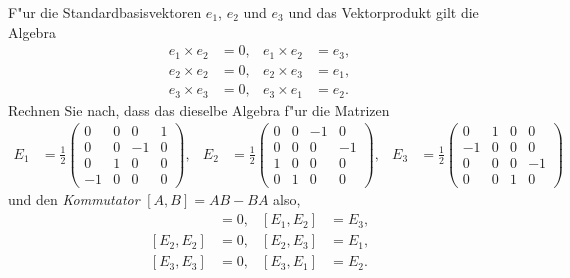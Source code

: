 F"ur die Standardbasisvektoren $e_1$, $e_2$ und $e_3$ und das Vektorprodukt
gilt die Algebra
\begin{align*}
e_1\times e_2&=0,&
e_1\times e_2&=e_3,\\
e_2\times e_2&=0,&
e_2\times e_3&=e_1,\\
e_3\times e_3&=0,&
e_3\times e_1&=e_2.
\end{align*}
Rechnen Sie nach, dass das dieselbe Algebra f"ur die Matrizen
\begin{align*}
E_1&=\frac12\begin{pmatrix}
 0& 0& 0& 1\\
 0& 0&-1& 0\\
 0& 1& 0& 0\\
-1& 0& 0& 0
\end{pmatrix},
&
E_2&=\frac12\begin{pmatrix}
 0& 0&-1& 0\\
 0& 0& 0&-1\\
 1& 0& 0& 0\\
 0& 1& 0& 0
\end{pmatrix},
&
E_3&=\frac12\begin{pmatrix}
 0& 1& 0& 0\\
-1& 0& 0& 0\\
 0& 0& 0&-1\\
 0& 0& 1& 0
\end{pmatrix}
&
\end{align*}
und den {\em Kommutator} $[A,B]=AB-BA$ also,
\begin{align*}
[E_1, E_2]&=0,&
[E_1, E_2]&=E_3,\\
[E_2, E_2]&=0,&
[E_2, E_3]&=E_1,\\
[E_3, E_3]&=0,&
[E_3, E_1]&=E_2.
\end{align*}

